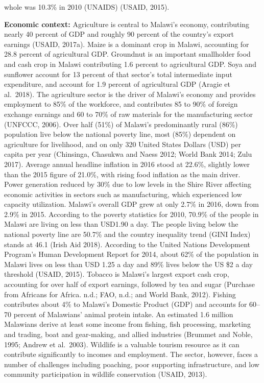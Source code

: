 \documentclass[
]{book}
\begin{document}
whole was 10.3\% in 2010 (UNAIDS) (USAID, 2015).

\textbf{Economic context:} Agriculture is central to Malawi's economy, contributing nearly 40 percent of GDP and roughly 90 percent of the country's export earnings (USAID, 2017a). Maize is a dominant crop in Malawi, accounting for 28.8 percent of agricultural GDP. Groundnut is an important smallholder food and cash crop in Malawi contributing 1.6 percent to agricultural GDP. Soya and sunflower account for 13 percent of that sector's total intermediate input expenditure, and account for 1.9 percent of agricultural GDP (Aragie et al.~2018). The agriculture sector is the driver of Malawi's economy and provides employment to 85\% of the workforce, and contributes 85 to 90\% of foreign exchange earnings and 60 to 70\% of raw materials for the manufacturing sector (UNFCCC, 2006). Over half (51\%) of Malawi's predominantly rural (86\%) population live below the national poverty line, most (85\%) dependent on agriculture for livelihood, and on only 320 United States Dollars (USD) per capita per year (Chinsinga, Chasukwa and Naess 2012; World Bank 2014; Zulu 2017). Average annual headline inflation in 2016 stood at 22.6\%, slightly lower than the 2015 figure of 21.0\%, with rising food inflation as the main driver. Power generation reduced by 30\% due to low levels in the Shire River affecting economic activities in sectors such as manufacturing, which experienced low capacity utilization. Malawi's overall GDP grew at only 2.7\% in 2016, down from 2.9\% in 2015. According to the poverty statistics for 2010, 70.9\% of the people in Malawi are living on less than USD1.90 a day. The people living below the national poverty line are 50.7\% and the country inequality trend (GINI Index) stands at 46.1 (Irish Aid 2018). According to the United Nations Development Program's Human Development Report for 2014, about 62\% of the population in Malawi lives on less than USD 1.25 a day and 89\% lives below the US \$2 a day threshold (USAID, 2015). Tobacco is Malawi's largest export cash crop, accounting for over half of export earnings, followed by tea and sugar (Purchase from Africans for Africa. n.d.; FAO, n.d.; and World Bank, 2012). Fishing contributes about 4\% to Malawi's Domestic Product (GDP) and accounts for 60--70 percent of Malawians' animal protein intake. An estimated 1.6 million Malawians derive at least some income from fishing, fish processing, marketing and trading, boat and gear-making, and allied industries (Brummet and Noble, 1995; Andrew et al.~2003). Wildlife is a valuable tourism resource as it can contribute significantly to incomes and employment. The sector, however, faces a number of challenges including poaching, poor supporting infrastructure, and low community participation in wildlife conservation (USAID, 2013).
\end{document}
